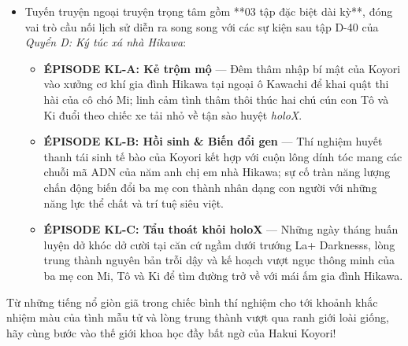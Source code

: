 \documentclass[main.tex]{subfiles}
\begin{document}
{}
\begin{itemize}
  \item Tuyến truyện ngoại truyện trọng tâm gồm **03 tập đặc biệt dài kỳ**, đóng vai trò cầu nối lịch sử diễn ra song song với các sự kiện sau tập D-40 của \textit{Quyển D: Ký túc xá nhà Hikawa}:
        \begin{itemize}
          \item \textbf{ÉPISODE KL-A: Kẻ trộm mộ} — Đêm thâm nhập bí mật của Koyori vào xưởng cơ khí gia đình Hikawa tại ngoại ô Kawachi để khai quật thi hài của cô chó Mi; linh cảm tình thâm thôi thúc hai chú cún con Tô và Ki đuổi theo chiếc xe tải nhỏ về tận sào huyệt \textit{holoX}.
          \item \textbf{ÉPISODE KL-B: Hồi sinh \& Biến đổi gen} — Thí nghiệm huyết thanh tái sinh tế bào của Koyori kết hợp với cuộn lông dính tóc mang các chuỗi mã ADN của năm anh chị em nhà Hikawa; sự cố tràn năng lượng chấn động biến đổi ba mẹ con thành nhân dạng con người với những năng lực thể chất và trí tuệ siêu việt.
          \item \textbf{ÉPISODE KL-C: Tẩu thoát khỏi holoX} — Những ngày tháng huấn luyện dở khóc dở cười tại căn cứ ngầm dưới trướng La+ Darknesss, lòng trung thành nguyên bản trỗi dậy và kế hoạch vượt ngục thông minh của ba mẹ con Mi, Tô và Ki để tìm đường trở về với mái ấm gia đình Hikawa.
        \end{itemize}
\end{itemize}

Từ những tiếng nổ giòn giã trong chiếc bình thí nghiệm cho tới khoảnh khắc nhiệm màu của tình mẫu tử và lòng trung thành vượt qua ranh giới loài giống, hãy cùng bước vào thế giới khoa học đầy bất ngờ của Hakui Koyori!
\end{document}
